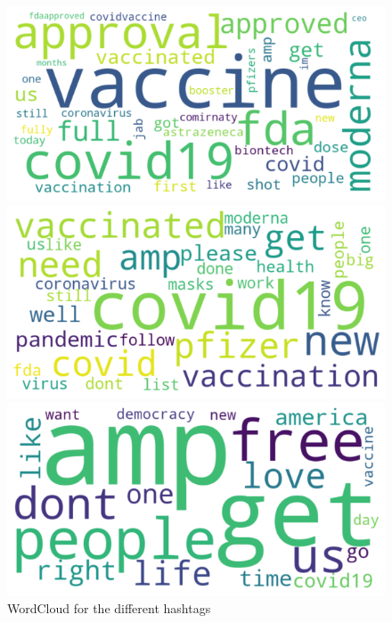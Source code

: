 \documentclass[12pt,%
               a4paper,%
               oneside,openany,%
               titlepage,%
               headinclude,footinclude,%
               BCOR5mm,%
               cleardoublepage=empty,%
               tablecaptionabove,%
               floatperchapter,
               ]{scrreprt}                 %
\begin{document}
\begin{figure}[ht]
\begin{minipage}[b]{0.5\linewidth}
    \vspace{4ex}
  \end{minipage}
    \begin{minipage}[b]{0.5\linewidth}
    \centering
    \includegraphics[width=.9\linewidth]{Figures/WordCloud_pfizer.png}
    \vspace{4ex}
  \end{minipage}
  \begin{minipage}[b]{0.5\linewidth}
    \centering
    \includegraphics[width=.9\linewidth]{Figures/WordCloud_Vaccine.png}
    \vspace{4ex}
  \end{minipage}
     \begin{minipage}[b]{0.5\linewidth}
    \centering
    \includegraphics[width=.9\linewidth]{Figures/WordCloud_Freedom.png}
    \vspace{4ex}
  \end{minipage}
\caption{WordCloud for the different hashtags}
\label{WordCloud_ALL}
\end{figure}
\end{document}
